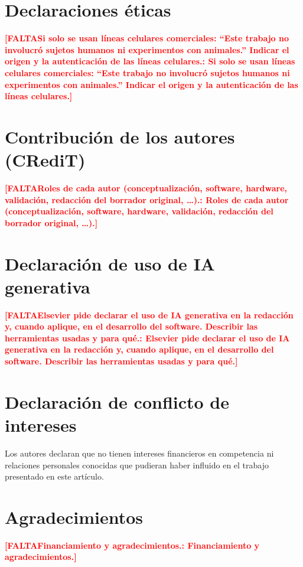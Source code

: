 \documentclass[preprint,12pt]{elsarticle}
\DeclareRobustCommand{\TODO}[1]{\textcolor{red}{\textbf{[FALTA\ifx\relax#1\relax\else: #1\fi]}}}
\begin{document}
\section*{Declaraciones éticas}

\TODO{Si solo se usan líneas celulares comerciales: ``Este trabajo no
involucró sujetos humanos ni experimentos con animales.'' Indicar el
origen y la autenticación de las líneas celulares.}

\section*{Contribución de los autores (CRediT)}

\TODO{Roles de cada autor (conceptualización, software, hardware,
validación, redacción del borrador original, \ldots).}

\section*{Declaración de uso de IA generativa}

\TODO{Elsevier pide declarar el uso de IA generativa en la redacción y,
cuando aplique, en el desarrollo del software. Describir las herramientas
usadas y para qué.}

\section*{Declaración de conflicto de intereses}

Los autores declaran que no tienen intereses financieros en competencia ni
relaciones personales conocidas que pudieran haber influido en el trabajo
presentado en este artículo.

\section*{Agradecimientos}

\TODO{Financiamiento y agradecimientos.}



\end{document}
